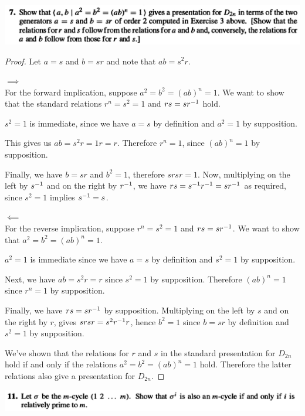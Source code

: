 \begin{mdframed}
\includegraphics[width=400pt]{img/algebra--nf--2-bb2c.png}
\end{mdframed}


\begin{proof}
  Let $a = s$ and $b = sr$ and note that $ab = s^2r$.

  $\implies$\\
  For the forward implication, suppose $a^2 = b^2 = (ab)^n = 1$. We want to show that the standard
  relations $r^n = s^2 = 1$ and $rs = sr^{-1}$ hold.

  $s^2 = 1$ is immediate, since we have $a = s$ by definition and $a^2 = 1$ by supposition.

  This gives us $ab = s^2r = 1r = r$. Therefore $r^n = 1$, since $(ab)^n = 1$ by supposition.

  Finally, we have $b = sr$ and $b^2 = 1$, therefore $srsr = 1$. Now, multiplying on the left
  by $s^{-1}$ and on the right by $r^{-1}$, we have $rs = s^{-1}r^{-1} = sr^{-1}$ as required, since
  $s^2 = 1$ implies $s^{-1} = s$.



  $\impliedby$\\
  For the reverse implication, suppose $r^n = s^2 = 1$ and $rs = sr^{-1}$. We want to show that $a^2 = b^2 = (ab)^n = 1$.

  $a^2 = 1$ is immediate since we have $a = s$ by definition and $s^2 = 1$ by supposition.

  Next, we have $ab = s^2r = r$ since $s^2 = 1$ by supposition. Therefore $(ab)^n = 1$ since
  $r^n = 1$ by supposition.

  Finally, we have $rs = sr^{-1}$ by supposition. Multiplying on the left by $s$ and on the right
  by $r$, gives $srsr = s^2r^{-1}r$, hence $b^2 = 1$ since $b = sr$ by definition and $s^2 = 1$ by
  supposition.


  We've shown that the relations for $r$ and $s$ in the standard presentation for $D_{2n}$ hold if
  and only if the relations $a^2 = b^2 = (ab)^n = 1$ hold. Therefore the latter relations also give a
  presentation for $D_{2n}$.
\end{proof}




\newpage
\begin{mdframed}
\includegraphics[width=400pt]{img/algebra--nf--2-0db6.png}
\end{mdframed}


